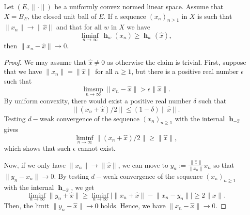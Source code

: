 \documentclass[10pt,a4paper]{amsart}
\DeclareMathOperator{\h}{\mathbf{h}}
\newcommand{\norm}[1]{\lVert#1\rVert}
\begin{document}
\begin{prop}
Let $(E,\norm{\cdot})$ be a uniformly convex normed linear space. Assume that 
$X=B_E$, the closed unit ball of $E$. If a sequence $(x_n)_{n\geq 1}$ in $X$ is 
such that $ \norm{x_n}  \rightarrow \norm{\hat x} $ and that for all $w$ in
$X$ we have 
$$
	\liminf_{n\to\infty}\,\h_w(x_n)  \geq \h_w(\hat x),
$$
then $ \norm{ x_n - \hat x }  \rightarrow 0$.
\end{prop}

\begin{proof} 
We may assume that $\hat x \not=0$ as otherwise the claim is trivial. First,
suppose that we have $\norm{x_n} = \norm{ \hat x }$ for all $n\geq 1$, but there 
is a positive real number $\epsilon$ such that
$$
	\limsup_{n\to\infty} \norm{x_n - \hat x }  > \epsilon\norm{\hat x}.
$$ 
By uniform convexity, there would exist a positive real number $\delta$ 
such that 
$$
\norm{ (x_n + \hat x)/2 }  \leq (1-\delta) \norm{\hat x }.
$$
Testing $d-$weak convergence of the sequence $(x_n)_{n\geq 1}$ with the 
internal $\h_{-\hat x}$ gives
$$
\liminf_{n\to\infty} \norm{ ( x_n + \hat x)/2 } \geq \norm{\hat x},
$$ 
which shows that such $\epsilon $ cannot exist. 

Now, if we only have  $ \norm{ x_n } \rightarrow \norm{\hat x }$, we can 
move to $y_n :=  \frac { \norm{ \hat x }}{\norm{x_n} } x_n$ so that 
$\norm{y_n -  x_n} \rightarrow 0$. By testing $d-$weak convergence of the 
sequence $(x_n)_{n\geq 1}$ with the internal $\h_{-\hat x}$, we get 
$$
	\liminf_{n\to\infty}\norm{ y_n + \hat x} 
	\geq \liminf_{n\to\infty}\Big|\norm{x_n + \hat x} - \norm{x_n - y_n} \Big| 
	\geq 2\norm{\hat x}.
$$ 
Then, the limit $\norm{y_n -  \hat x} \rightarrow 0$ holds. Hence, 
we have $\norm{x_n -  \hat x} \rightarrow 0$.
\end{proof} 
\end{document}
